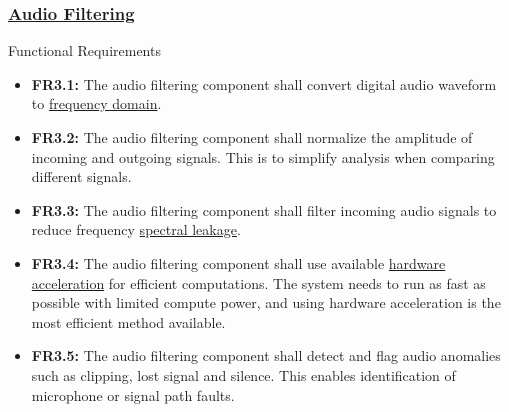 \documentclass[12pt]{article}
\theoremstyle{definition}
\begin{document}
\subsubsection{\hyperref[comp:audio_filtering]{Audio Filtering}} Functional
Requirements \label{sec:FR3}
\begin{itemize}
  \item \label{FR3_1}\textbf{FR3.1:} The audio filtering component shall convert
  digital audio waveform to \hyperref[def:frequency_domain]{frequency domain}.

  \item \label{FR3_2}\textbf{FR3.2:} The audio filtering component shall
  normalize the amplitude of incoming and outgoing signals. This is to simplify 
  analysis when comparing different signals.

  \item \label{FR3_3}\textbf{FR3.3:} The audio filtering component shall filter
  incoming audio signals to reduce frequency
  \hyperref[def:spectral_leakage]{spectral leakage}.

  \item \label{FR3_4}\textbf{FR3.4:} The audio filtering component shall use
  available \hyperref[def:hardware_acceleration]{hardware acceleration}
  for efficient computations. The system needs to run as fast as possible with
  limited compute power, and using hardware acceleration is the most efficient
  method available.

  \item \label{FR3_5}\textbf{FR3.5:} The audio filtering component shall detect
  and flag audio anomalies such as clipping, lost signal and silence. This
  enables identification of microphone or signal path faults.
\end{itemize}
\end{document}
